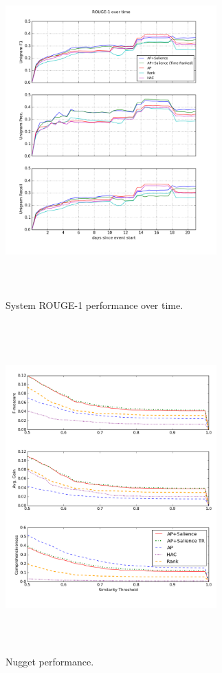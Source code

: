 \begin{figure}
  \includegraphics[width=3.2in,height=5in]{rouge-time.png}
\caption{System ROUGE-1 performance over time.}
\label{fig:trouge}
\end{figure}

\begin{figure}
  \includegraphics[width=3.2in,height=5in]{nugget-metrics.png}
\caption{Nugget performance.}
\label{fig:nperf}
\end{figure}

